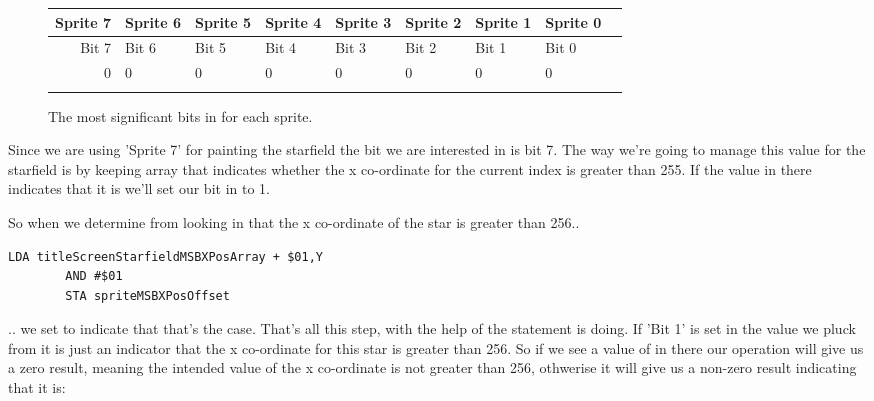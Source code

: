 \begin{figure}[H]
  {
    \setlength{\tabcolsep}{3.0pt}
    \setlength\cmidrulewidth{\heavyrulewidth} %
    \begin{adjustbox}{width=10cm,center}

      \begin{tabular}{rllllllll}
        \toprule
        Sprite 7 & Sprite 6 & Sprite 5 & Sprite 4 & Sprite 3 & Sprite 2 & Sprite 1 & Sprite 0        \\
        \midrule
        Bit 7 & Bit 6 & Bit 5 & Bit 4 & Bit 3 & Bit 2 & Bit 1 & Bit 0        \\
        \midrule
        0 & 0 & 0 & 0 & 0 & 0 & 0 & 0 \\
        \addlinespace
        \bottomrule
      \end{tabular}

    \end{adjustbox}

  }\caption*{The most significant bits in  for each sprite.}
\end{figure}

Since we are using 'Sprite 7' for painting the starfield the bit we are interested in is bit 7. The way
we're going to manage this value for the starfield is by keeping array 
that indicates whether the x co-ordinate for the current index is greater than 255. If the value in there
indicates that it is we'll set our bit in  to 1.

So when
we determine from looking in  that the x co-ordinate of the star is greater
than 256..

\begin{lstlisting}[basicstyle=\tiny]
        LDA titleScreenStarfieldMSBXPosArray + $01,Y
        AND #$01
        STA spriteMSBXPosOffset
\end{lstlisting}

.. we set  to indicate that that's the case. That's all this step, with the help
of the  statement is doing. If 'Bit 1' is
set in the value we pluck from  it is just an indicator that the x co-ordinate
for this star is greater than 256. So if we see a value of  in there our operation  will
give us a zero result, meaning the intended value of the x co-ordinate is not greater than 256, othwerise it will give
us a non-zero result indicating that it is:

